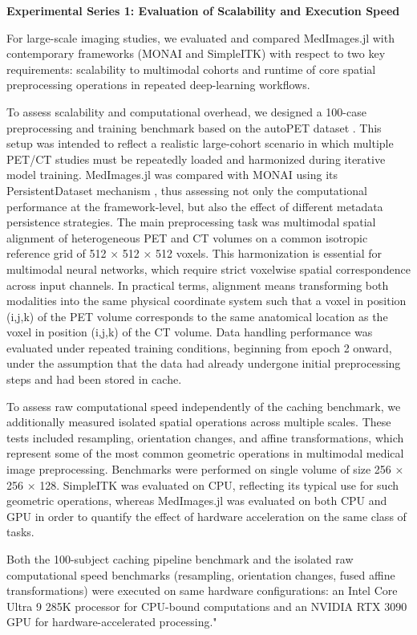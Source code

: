 \documentclass[a4paper,10pt,preprint]{elsarticle}
\begin{document}
\textbf{Experimental Series 1: Evaluation of Scalability and Execution Speed}

For large-scale imaging studies, we evaluated and compared MedImages.jl with contemporary frameworks (MONAI and SimpleITK) with respect to two key requirements: scalability to multimodal cohorts and runtime of core spatial preprocessing operations in repeated deep-learning workflows.

To assess scalability and computational overhead, we designed a 100-case preprocessing and training benchmark based on the autoPET dataset \cite{Dexl_2025}. This setup was intended to reflect a realistic large-cohort scenario in which multiple PET/CT studies must be repeatedly loaded and harmonized during iterative model training.
MedImages.jl was compared with MONAI using its PersistentDataset mechanism \cite{KaliyugarasanLundervold2023}, thus assessing not only the computational performance at the framework-level, but also the effect of different metadata persistence strategies. 
The main preprocessing task was multimodal spatial alignment of heterogeneous PET and CT volumes on a common isotropic reference grid of 512 × 512 × 512 voxels. This harmonization is essential for multimodal neural networks, which require strict voxelwise spatial correspondence across input channels. In practical terms, alignment means transforming both modalities into the same physical coordinate system such that a voxel in position (i,j,k) of the PET volume corresponds to the same anatomical location as the voxel in position (i,j,k) of the CT volume.
Data handling performance was evaluated under repeated training conditions, beginning from epoch 2 onward, under the assumption that the data had already undergone initial preprocessing steps and had been stored in cache.

To assess raw computational speed independently of the caching benchmark, we additionally measured isolated spatial operations across multiple scales. These tests included resampling, orientation changes, and affine transformations, which represent some of the most common geometric operations in multimodal medical image preprocessing. Benchmarks were performed on single volume of size 256 × 256 × 128.  SimpleITK was evaluated on CPU, reflecting its typical use for such geometric operations, whereas MedImages.jl was evaluated on both CPU and GPU in order to quantify the effect of hardware acceleration on the same class of tasks.

Both the 100-subject caching pipeline benchmark and the isolated raw computational speed benchmarks (resampling, orientation changes, fused affine transformations) were executed on same hardware configurations: an Intel Core Ultra 9 285K processor for CPU-bound computations and an NVIDIA RTX 3090 GPU for hardware-accelerated processing."
\end{document}
